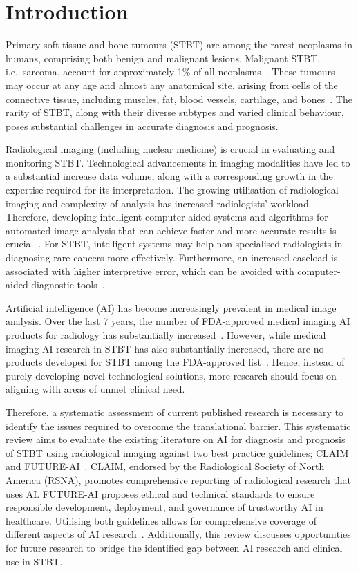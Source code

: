 \section{Introduction}
Primary soft-tissue and bone tumours (STBT) are among the rarest neoplasms in humans, comprising both benign and malignant lesions.
Malignant STBT, i.e.\ sarcoma, account for approximately 1\% of all neoplasms~\autocite{cormier2004}.
These tumours may occur at any age and almost any anatomical site, arising from cells of the connective tissue, including muscles, fat, blood vessels, cartilage, and bones~\autocite{kruiswijk2023}.
The rarity of STBT, along with their diverse subtypes and varied clinical behaviour, poses substantial challenges in accurate diagnosis and prognosis.

Radiological imaging (including nuclear medicine) is crucial in evaluating and monitoring STBT.
Technological advancements in imaging modalities have led to a substantial increase data volume, along with a corresponding growth in the expertise required for its interpretation.
The growing utilisation of radiological imaging and complexity of analysis has increased radiologists' workload.
Therefore, developing intelligent computer-aided systems and algorithms for automated image analysis that can achieve faster and more accurate results is crucial~\autocite{zhang2019radiological}.
For STBT, intelligent systems may help non-specialised radiologists in diagnosing rare cancers more effectively.
Furthermore, an increased caseload is associated with higher interpretive error, which can be avoided with computer-aided diagnostic tools~\autocite{hanna2018,bechtold1997}.

Artificial intelligence (AI) has become increasingly prevalent in medical image analysis.
Over the last 7 years, the number of FDA-approved medical imaging AI products for radiology has substantially increased~\autocite{mcnabb2024}.
However, while medical imaging AI research in STBT has also substantially increased, there are no products developed for STBT among the FDA-approved list~\autocite{fda2024}.
Hence, instead of purely developing novel technological solutions, more research should focus on aligning with areas of unmet clinical need.

Therefore, a systematic assessment of current published research is necessary to identify the issues required to overcome the translational barrier.
This systematic review aims to evaluate the existing literature on AI for diagnosis and prognosis of STBT using radiological imaging against two best practice guidelines; CLAIM and FUTURE-AI~\autocite{lekadir2025,tejani2024}.
CLAIM, endorsed by the Radiological Society of North America (RSNA), promotes comprehensive reporting of radiological research that uses AI.
FUTURE-AI proposes ethical and technical standards to ensure responsible development, deployment, and governance of trustworthy AI in healthcare.
Utilising both guidelines allows for comprehensive coverage of different aspects of AI research~\autocite{klontzas2023}.
Additionally, this review discusses opportunities for future research to bridge the identified gap between AI research and clinical use in STBT.

